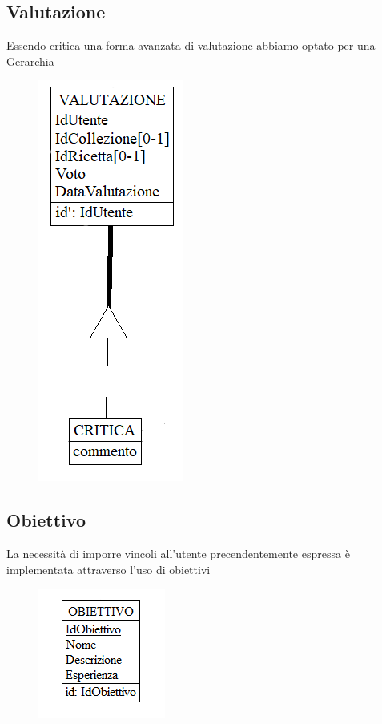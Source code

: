 ﻿\documentclass[a4paper,12pt]{report}
\begin{document}
\subsection{Valutazione}
Essendo critica una forma avanzata di valutazione
abbiamo optato per una Gerarchia
\begin{figure}[H]
    \centering
    \includegraphics[width=0.2\linewidth]{app_images/valutazione-concettuale.png}
\end{figure}
\subsection{Obiettivo}
La necessità di imporre vincoli all'utente precendentemente espressa
è implementata attraverso l'uso di obiettivi
\begin{figure}[H]
    \centering
    \includegraphics[width=0.5\linewidth]{app_images/obiettivo-concettuale.png}
\end{figure}
\end{document}
